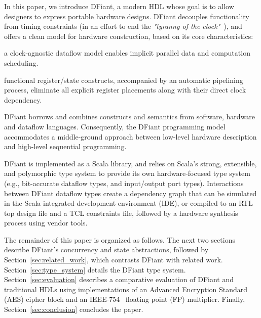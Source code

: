 In this paper, we introduce DFiant, a modern HDL whose goal is to allow designers to express portable hardware designs.
DFiant decouples functionality from timing constraints (in an effort to end the \emph{"tyranny of the clock"}~\cite{Sutherland2012}), and offers a clean model for hardware construction, based on its core characteristics:
\begin{enumerate*}[label=(\roman*)]
\item
  a clock-agnostic dataflow model enables implicit parallel data and computation scheduling. 
\item
  functional register/state constructs, accompanied by an automatic pipelining process, eliminate all explicit register placements along with their direct clock dependency.
\end{enumerate*} DFiant borrows and combines constructs and semantics from software, hardware and dataflow languages. Consequently, the DFiant programming model accommodates a middle-ground approach between low-level hardware description and high-level sequential programming. 

DFiant is implemented as a Scala library, and relies on Scala's strong, extensible, and polymorphic type system to provide its own hardware-focused type system (e.g., bit-accurate dataflow types, and input/output port types). Interactions between DFiant dataflow types create a dependency graph that can be simulated in the Scala integrated development environment (IDE), or compiled to an RTL top design file and a TCL constraints file, followed by a hardware synthesis process using vendor tools.
 

The remainder of this paper is organized as follows. 
The next two sections describe DFiant's concurrency and state abstractions, followed by Section~\ref{sec:related_work}, which contrasts DFiant with related work. 
Section~\ref{sec:type_system} details the DFiant type system.
Section~\ref{sec:evaluation} describes a comparative evaluation of DFiant and traditional HDLs using implementations of an Advanced Encryption Standard~\cite{pub2001197} (AES) cipher block and an IEEE-754~\cite{IEEE2008} floating point (FP) multiplier.
Finally, Section~\ref{sec:conclusion} concludes the paper.
 


